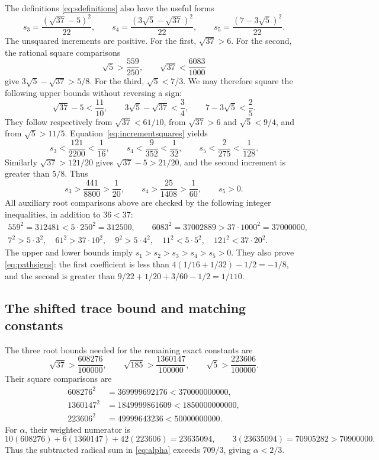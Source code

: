 \documentclass[11pt]{article}
\theoremstyle{definition}
\theoremstyle{remark}
\begin{document}
The definitions \eqref{eq:sdefinitions} also have the useful forms
\begin{equation}\label{eq:incrementsquares}
 s_3=\frac{(\sqrt{37}-5)^2}{22},\qquad
 s_4=\frac{(3\sqrt5-\sqrt{37})^2}{22},\qquad
 s_5=\frac{(7-3\sqrt5)^2}{22}.
\end{equation}
The unsquared increments are positive. For the first, $\sqrt{37}>6$.
For the second, the rational square comparisons
\[
 \sqrt5>\frac{559}{250},\qquad
 \sqrt{37}<\frac{6083}{1000}
\]
give $3\sqrt5-\sqrt{37}>5/8$. For the third,
$\sqrt5<7/3$. We may therefore square the following upper bounds
without reversing a sign:
\[
 \sqrt{37}-5<\frac{11}{10},\qquad
 3\sqrt5-\sqrt{37}<\frac34,\qquad
 7-3\sqrt5<\frac25.
\]
They follow respectively from $\sqrt{37}<61/10$, from
$\sqrt{37}>6$ and $\sqrt5<9/4$, and from $\sqrt5>11/5$.
Equation~\eqref{eq:incrementsquares} yields
\begin{equation}\label{eq:supper}
 s_3<\frac{121}{2200}<\frac1{16},\qquad
 s_4<\frac9{352}<\frac1{32},\qquad
 s_5<\frac2{275}<\frac1{128}.
\end{equation}
Similarly $\sqrt{37}>121/20$ gives
$\sqrt{37}-5>21/20$, and the second increment is greater than $5/8$.
Thus
\begin{equation}\label{eq:slower}
 s_3>\frac{441}{8800}>\frac1{20},\qquad
 s_4>\frac{25}{1408}>\frac1{60},\qquad s_5>0.
\end{equation}
All auxiliary root comparisons above are checked by the following
integer inequalities, in addition to $36<37$:
\[
 \begin{gathered}
 559^2=312481<5\cdot250^2=312500,\qquad
 6083^2=37002889>37\cdot1000^2=37000000,\\
 7^2>5\cdot3^2,\quad 61^2>37\cdot10^2,\quad
 9^2>5\cdot4^2,\quad11^2<5\cdot5^2,\quad
 121^2<37\cdot20^2.
 \end{gathered}
\]
The upper and lower bounds imply
$s_1>s_2>s_3>s_4>s_5>0$. They also prove
\eqref{eq:pathsigns}: the first coefficient is less than
$4(1/16+1/32)-1/2=-1/8$, and the second is greater than
$9/22+1/20+3/60-1/2=1/110$.

\subsection{The shifted trace bound and matching constants}

The three root bounds needed for the remaining exact constants are
\begin{equation}\label{eq:finerooots}
 \sqrt{37}>\frac{608276}{100000},\qquad
 \sqrt{185}>\frac{1360147}{100000},\qquad
 \sqrt5>\frac{223606}{100000}.
\end{equation}
Their square comparisons are
\[
 \begin{aligned}
 608276^2&=369999692176<370000000000,\\
 1360147^2&=1849999861609<1850000000000,\\
 223606^2&=49999643236<50000000000.
 \end{aligned}
\]
For $\alpha$, their weighted numerator is
\[
 10(608276)+6(1360147)+42(223606)=23635094,
 \qquad3(23635094)=70905282>70900000.
\]
Thus the subtracted radical sum in \eqref{eq:alpha} exceeds $709/3$,
giving $\alpha<2/3$.
\end{document}
